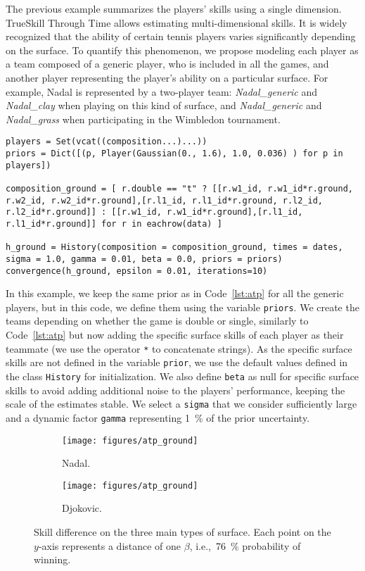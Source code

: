 \documentclass[article]{jss}
\begin{document}
The previous example summarizes the players' skills using a single dimension. 
TrueSkill Through Time allows estimating multi-dimensional skills. 
It is widely recognized that the ability of certain tennis players varies significantly depending on the surface. 
To quantify this phenomenon, we propose modeling each player as a team composed of a generic player, who is included in all the games, and another player representing the player's ability on a particular surface. 
For example, Nadal is represented by a two-player team: \emph{Nadal\_generic} and \emph{Nadal\_clay} when playing on this kind of surface, and \emph{Nadal\_generic} and \emph{Nadal\_grass} when participating in the Wimbledon tournament. 
%
\begin{lstlisting}[captionpos=b,backgroundcolor=\color{julia!60},label=lst:atp_ground, caption={Modeling multi-dimensional skills in ATP history.}, belowskip=0cm]
players = Set(vcat((composition...)...))
priors = Dict([(p, Player(Gaussian(0., 1.6), 1.0, 0.036) ) for p in players])

composition_ground = [ r.double == "t" ? [[r.w1_id, r.w1_id*r.ground, r.w2_id, r.w2_id*r.ground],[r.l1_id, r.l1_id*r.ground, r.l2_id, r.l2_id*r.ground]] : [[r.w1_id, r.w1_id*r.ground],[r.l1_id, r.l1_id*r.ground]] for r in eachrow(data) ]   

h_ground = History(composition = composition_ground, times = dates, sigma = 1.0, gamma = 0.01, beta = 0.0, priors = priors)
convergence(h_ground, epsilon = 0.01, iterations=10)
\end{lstlisting}
%
In this example, we keep the same prior as in Code~\ref{lst:atp} for all the generic players, but in this code, we define them using the variable \texttt{priors}. 
We create the teams depending on whether the game is double or single, similarly to Code~\ref{lst:atp} but now adding the specific surface skills of each player as their teammate (we use the operator \texttt{*} to concatenate strings). 
As the specific surface skills are not defined in the variable \texttt{prior}, we use the default values defined in the class  \texttt{History} for initialization. 
We also define \texttt{beta} as null for specific surface skills to avoid adding additional noise to the players' performance, keeping the scale of the estimates stable. 
We select a \texttt{sigma} that we consider sufficiently large and a dynamic factor \texttt{gamma} representing \SI{1}{\percent} of the prior uncertainty. 
%
\begin{figure}[ht!]
    \centering
    \begin{subfigure}[t]{0.48\textwidth}
    \texttt{[image: figures/atp\_ground]}
    \caption{Nadal.}
    \end{subfigure}
    \begin{subfigure}[t]{0.48\textwidth}
    \texttt{[image: figures/atp\_ground]}
    \caption{Djokovic.}
    \end{subfigure}
    \caption{
    Skill difference on the three main types of surface. 
    Each point on the $y$-axis represents a distance of one $\beta$, i.e.,~\SI{76}{\percent} probability of winning. 
    }
    \label{fig:atp_ground}
\end{figure}
\end{document}

